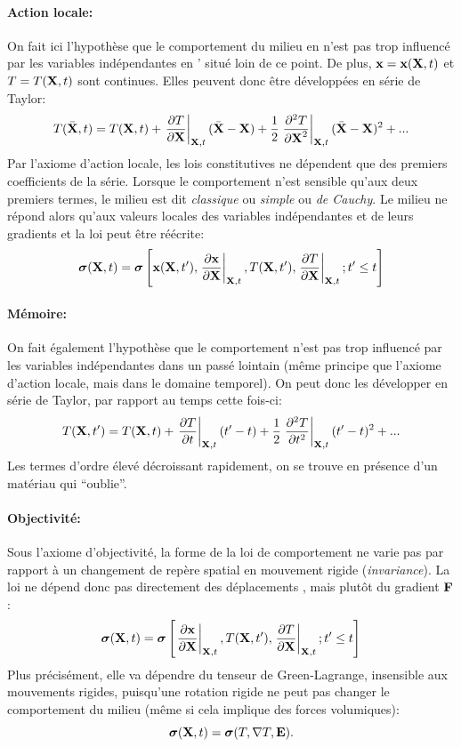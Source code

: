 \paragraph{Action locale: } On fait ici l'hypothèse que le comportement du milieu en  n'est pas trop influencé par les variables indépendantes en ' situé loin de ce point. De plus, $\textbf{x}=\textbf{x}(\textbf{X},t)$ et $T=T(\textbf{X},t)$ sont continues. Elles peuvent donc être développées en série de Taylor:
$$T(\bar{\textbf{X}},t)=T(\textbf{X},t)+\left.\frac{\partial T}{\partial \textbf{X}}\right|_{\textbf{X},t}(\bar{\textbf{X}}-\textbf{X})+\frac{1}{2}\left.\frac{\partial^2T}{\partial\textbf{X}^2}\right|_{\textbf{X},t}(\bar{\textbf{X}}-\textbf{X})^2+...$$ Par l'axiome d'action locale, les lois constitutives ne dépendent que des premiers coefficients de la série. Lorsque le comportement n'est sensible qu'aux deux premiers termes, le milieu est dit \emph{classique} ou \emph{simple} ou \emph{de Cauchy}. Le milieu ne répond alors qu'aux valeurs locales des variables indépendantes et de leurs gradients et la loi peut être réécrite:
$$\boldsymbol{\sigma}(\textbf{X},t)=\boldsymbol{\sigma}\left[\textbf{x}(\textbf{X},t'),\left.\frac{\partial \textbf{x}}{\partial\textbf{X}}\right|_{\textbf{X},t},T(\textbf{X},t'),\left.\frac{\partial T}{\partial \textbf{X}}\right|_{\textbf{X},t}; t'\leq t\right]$$
\paragraph{Mémoire: } On fait également l'hypothèse que le comportement n'est pas trop influencé par les variables indépendantes dans un passé lointain (même principe que l'axiome d'action locale, mais dans le domaine temporel). On peut donc les développer en série de Taylor, par rapport au temps cette fois-ci:
$$T(\textbf{X},t')=T(\textbf{X},t)+\left.\frac{\partial T}{\partial t}\right|_{\textbf{X},t}(t'-t)+\frac{1}{2}\left.\frac{\partial^2T}{\partial t^2}\right|_{\textbf{X},t}(t'-t)^2+...$$ Les termes d'ordre élevé décroissant rapidement, on se trouve en présence d'un matériau qui ``oublie''.
\paragraph{Objectivité: } Sous l'axiome d'objectivité, la forme de la loi de comportement ne varie pas par rapport à un changement de repère spatial en mouvement rigide (\emph{invariance}). La loi ne dépend donc pas directement des déplacements , mais plutôt du gradient $\textbf{F}$:
$$\boldsymbol{\sigma}(\textbf{X},t)=\boldsymbol{\sigma}\left[\left.\frac{\partial \textbf{x}}{\partial\textbf{X}}\right|_{\textbf{X},t},T(\textbf{X},t'),\left.\frac{\partial T}{\partial \textbf{X}}\right|_{\textbf{X},t}; t'\leq t\right]$$ Plus précisément, elle va dépendre du tenseur de Green-Lagrange, insensible aux mouvements rigides, puisqu'une rotation rigide ne peut pas changer le comportement du milieu (même si cela implique des forces volumiques): $$\boldsymbol{\sigma}(\textbf{X},t)=\boldsymbol{\sigma}(T,\nabla T, \textbf{E}).$$
